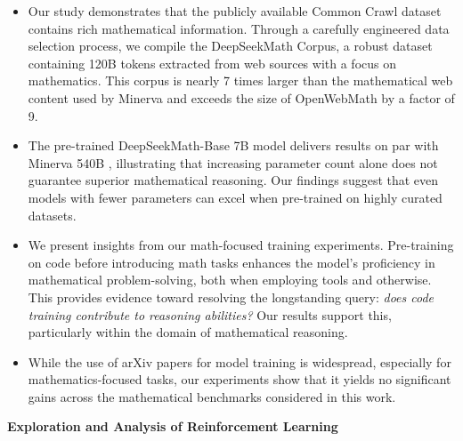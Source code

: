 \begin{itemize}[topsep=0pt]
    \item Our study demonstrates that the publicly available Common Crawl dataset contains rich mathematical information. Through a carefully engineered data selection process, we compile the DeepSeekMath Corpus, a robust dataset containing 120B tokens extracted from web sources with a focus on mathematics. This corpus is nearly 7 times larger than the mathematical web content used by Minerva \citep{minerva} and exceeds the size of OpenWebMath \citep{openwebmath} by a factor of 9.

    \item The pre-trained DeepSeekMath-Base 7B model delivers results on par with Minerva 540B \citep{minerva}, illustrating that increasing parameter count alone does not guarantee superior mathematical reasoning. Our findings suggest that even models with fewer parameters can excel when pre-trained on highly curated datasets.

    \item We present insights from our math-focused training experiments. Pre-training on code before introducing math tasks enhances the model’s proficiency in mathematical problem-solving, both when employing tools and otherwise. This provides evidence toward resolving the longstanding query: \textit{does code training contribute to reasoning abilities?} Our results support this, particularly within the domain of mathematical reasoning.

    \item While the use of arXiv papers for model training is widespread, especially for mathematics-focused tasks, our experiments show that it yields no significant gains across the mathematical benchmarks considered in this work.
\end{itemize}

\textbf{Exploration and Analysis of Reinforcement Learning}

